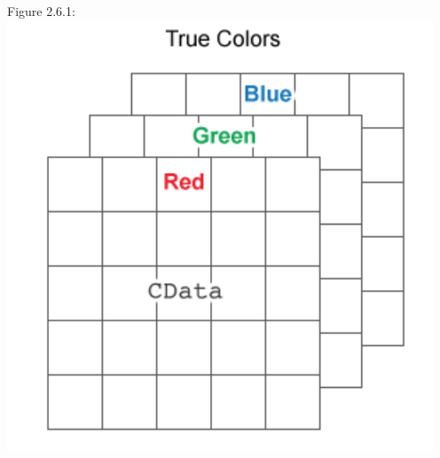 \documentclass[12pt]{article}
\begin{document}
\begin{center}
  Figure 2.6.1:\\
  \includegraphics[width=5in]{plots/km_plot7.png}\\


\end{center}
\end{document}
